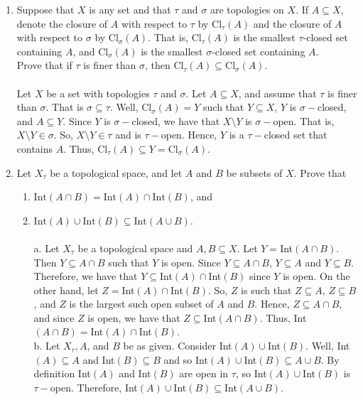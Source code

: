 \documentclass[12pt]{article}
\begin{document}
\begin{enumerate}
\item Suppose that $X$ is any set and that $\tau$ and $\sigma$ are topologies on $X$. If $A\subseteq X$, denote the closure of $A$ with respect to $\tau$ by $\text{Cl}_{\tau} (A)$ and the closure of $A$ with respect to $\sigma$ by $\text{Cl}_{\sigma} (A)$. That is, $\text{Cl}_{\tau} (A)$ is the smallest $\tau$-closed set containing $A$, and $\text{Cl}_{\sigma} (A)$ is the smallest $\sigma$-closed set containing $A$.\\Prove that if $\tau$ is finer than $\sigma$, then $\text{Cl}_{\tau} (A)\subseteq \text{Cl}_{\sigma} (A)$.\\\\
Let $X$ be a set with topologies $\tau$ and $\sigma$. Let $A\subseteq X$, and assume that $\tau$ is finer than $\sigma$. That is $\sigma\subseteq\tau$. Well, Cl$_{\sigma}(A)=Y$ such that $Y\subseteq X$, $Y$ is $\sigma-$closed, and $A\subseteq Y$. Since $Y$ is $\sigma-$closed, we have that $X\setminus Y$ is $\sigma-$open. That is, $X\setminus Y\in\sigma$. So, $X\setminus Y\in\tau$ and is $\tau-$open. Hence, $Y$ is a $\tau-$closed set that contains $A$. Thus, Cl$_{\tau}(A)\subseteq Y=$Cl$_{\sigma}(A)$.\\[20pt]

\item Let $X_{\tau}$ be a topological space, and let $A$ and $B$ be subsets of $X$. Prove that \begin{enumerate}\item $\text{Int}(A\cap B) = \text{Int}(A)\cap \text{Int}(B)$, and 
\item $\text{Int}(A)\cup \text{Int}(B)\subseteq \text{Int}(A\cup B)$.\\\\
a. Let $X_{\tau}$ be a topological space and $A,B\subseteq X$. Let $Y=$Int$(A\cap B)$. Then $Y\subseteq A\cap B$ such that $Y$ is open. Since $Y\subseteq A\cap B$, $Y\subseteq A$ and $Y\subseteq B$. Therefore, we have that $Y\subseteq $Int$(A)\cap $Int$(B)$ since $Y$ is open. On the other hand, let $Z=$Int$(A)\cap $Int$(B)$. So, $Z$ is such that $Z\subseteq A$, $Z\subseteq B$, and $Z$ is the largest such open subset of $A$ and $B$. Hence, $Z\subseteq A\cap B$, and since $Z$ is open, we have that $Z\subseteq $Int$(A\cap B)$. Thus, Int$(A\cap B)=$Int$(A)\cap $Int$(B)$.\\
b. Let $X_{\tau}, A$, and $B$ be as given. Consider Int$(A)\cup $Int$(B)$. Well, Int$(A)\subseteq A$ and Int$(B)\subseteq B$ and so Int$(A)\cup $Int$(B)\subseteq A\cup B$. By definition Int$(A)$ and Int$(B)$ are open in $\tau$, so Int$(A)\cup $Int$(B)$ is $\tau-$open. Therefore, Int$(A)\cup $Int$(B)\subseteq $Int$(A\cup B)$.
\end{enumerate}
\end{enumerate}
\end{document}
